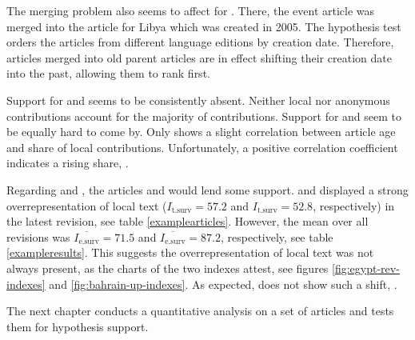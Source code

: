 The merging problem also seems to affect  for .
There, the event article was merged into the article for Libya which was created in 2005.
The hypothesis test orders the articles from different language editions by creation date.
Therefore, articles merged into old parent articles are in effect shifting their creation date into the past, allowing them to rank first.

Support for  and   seems to be consistently absent.
Neither local nor anonymous contributions account for the majority of contributions.
Support for  and   seem to be equally hard to come by.
Only  shows a slight correlation between article age and share of local contributions.
Unfortunately, a positive correlation coefficient indicates a rising share, .


Regarding  and , the articles   and  would lend some support.
 and  displayed a strong overrepresentation of local text ($I_{\text{t.surv}} = 57.2$ and $I_{\text{t.surv}} = 52.8$, respectively) in the latest revision, see table \ref{examplearticles}.
However, the mean over all revisions was $\overline{I_{\text{e.surv}}} = 71.5$ and $\overline{I_{\text{e.surv}}} = 87.2$, respectively,  see table \ref{exampleresults}.
This suggests the overrepresentation of local text was not always present, as the charts of the two indexes attest, see figures \ref{fig:egypt-rev-indexes} and \ref{fig:bahrain-up-indexes}.
As expected,  does not show such a shift, .

The next chapter  conducts a quantitative analysis on a set of articles and tests them for hypothesis support.
\clearpage 


 
